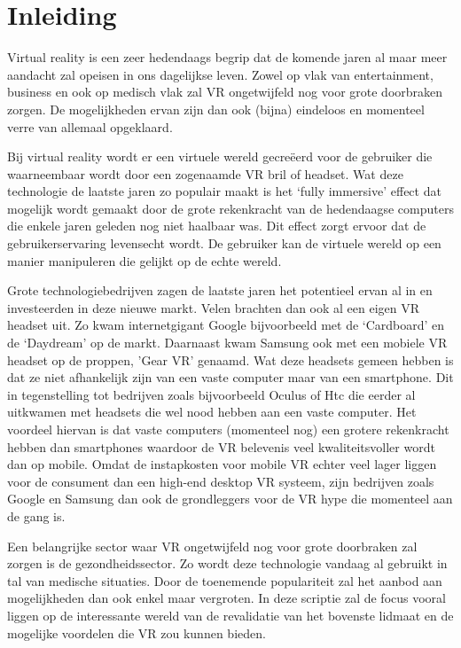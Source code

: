 
\chapter{Inleiding}
\label{ch:inleiding}

Virtual reality is een zeer hedendaags begrip dat de komende jaren al maar meer aandacht zal opeisen in ons dagelijkse leven. Zowel op vlak van entertainment, business en ook op medisch vlak zal VR ongetwijfeld nog voor grote doorbraken zorgen. De mogelijkheden ervan zijn dan ook (bijna) eindeloos en momenteel verre van allemaal opgeklaard.

Bij virtual reality wordt er een virtuele wereld gecreëerd voor de gebruiker die waarneembaar wordt door een zogenaamde VR bril of headset. Wat deze technologie de laatste jaren zo populair maakt is het ‘fully immersive’ effect dat mogelijk wordt gemaakt door de grote rekenkracht van de hedendaagse computers die enkele jaren geleden nog niet haalbaar was. Dit effect zorgt ervoor dat de gebruikerservaring levensecht wordt. De gebruiker kan de virtuele wereld op een manier manipuleren die gelijkt op de echte wereld. 

Grote technologiebedrijven zagen de laatste jaren het potentieel ervan al in en investeerden in deze nieuwe markt. Velen brachten dan ook al een eigen VR headset uit. Zo kwam internetgigant Google bijvoorbeeld met de ‘Cardboard’ en de ‘Daydream’ op de markt. Daarnaast kwam Samsung ook met een mobiele VR headset op de proppen, 'Gear VR’ genaamd. Wat deze headsets gemeen hebben is dat ze niet afhankelijk zijn van een vaste computer maar van een smartphone. Dit in tegenstelling tot bedrijven zoals bijvoorbeeld Oculus of Htc die eerder al uitkwamen met headsets die wel nood hebben aan een vaste computer. Het voordeel hiervan is dat vaste computers (momenteel nog) een grotere rekenkracht hebben dan smartphones waardoor de VR belevenis veel kwaliteitsvoller wordt dan op mobile. Omdat de instapkosten voor mobile VR echter veel lager liggen voor de consument dan een high-end desktop VR systeem, zijn bedrijven zoals Google en Samsung dan ook de grondleggers voor de VR hype die momenteel aan de gang is.


Een belangrijke sector waar VR ongetwijfeld nog voor grote doorbraken zal zorgen is de gezondheidssector. Zo wordt deze technologie vandaag al gebruikt in tal van medische situaties. Door de toenemende populariteit zal het aanbod aan mogelijkheden dan ook enkel maar vergroten. In deze scriptie zal de focus vooral liggen op de interessante wereld van de revalidatie van het bovenste lidmaat en de mogelijke voordelen die VR zou kunnen bieden.


